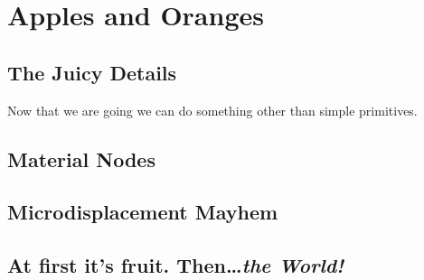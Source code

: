 \chapter{Apples and Oranges} %
\section{The Juicy Details} %
Now that we are going we can do something other than simple primitives.
\section{Material Nodes}
\section{Microdisplacement Mayhem}
\section{At first it's fruit.  Then\ldots \emph{the World!}} %
